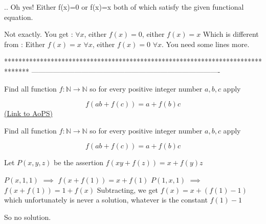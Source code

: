 


\begin{solution}
	\begin{tcolorbox}.. Oh yes! Either f(x)=0 or f(x)=x both of which satisfy the given functional equation.\end{tcolorbox}
Not exactly.
You get : $\forall x$, either $f(x)=0$, either $f(x)=x$
Which is different from : Either $f(x)=x$ $\forall x$, either $f(x)=0$ $\forall x$. 
You need some lines more.
\end{solution}
*******************************************************************************
-------------------------------------------------------------------------------

\begin{problem}
	Find all function $f: \mathbb{N} \rightarrow \mathbb{N}$ so for every positive integer number $a, b, c$ apply

\[ f(ab+f( c ))=a+f(b)c \]
	\flushright \href{https://artofproblemsolving.com/community/c6h579662}{(Link to AoPS)}
\end{problem}



\begin{solution}
	\begin{tcolorbox}Find all function $f: \mathbb{N} \rightarrow \mathbb{N}$ so for every positive integer number $a, b, c$ apply

\[ f(ab+f( c ))=a+f(b)c \]\end{tcolorbox}
Let $P(x,y,z)$ be the assertion $f(xy+f(z))=x+f(y)z$

$P(x,1,1)$ $\implies$ $f(x+f(1))=x+f(1)$
$P(1,x,1)$ $\implies$ $f(x+f(1))=1+f(x)$
Subtracting, we get $f(x)=x+(f(1)-1)$ which unfortunately is never a solution, whatever is the constant $f(1)-1$

So no solution.
\end{solution}



